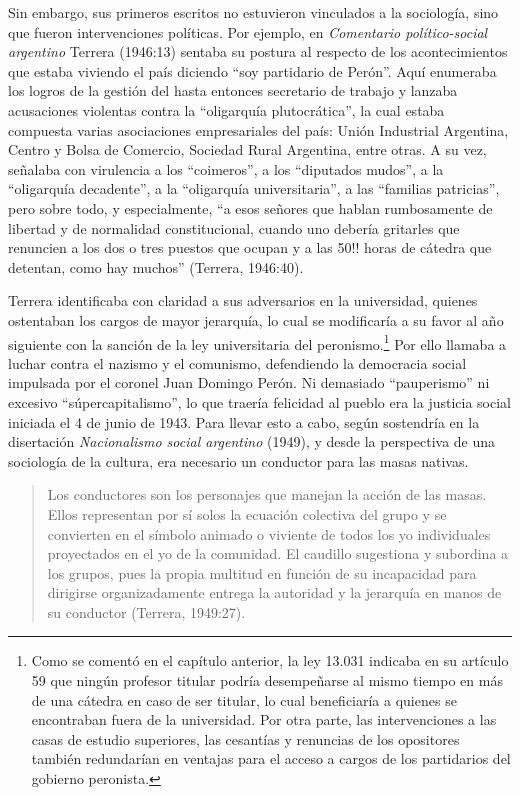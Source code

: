 Sin embargo, sus primeros escritos no estuvieron vinculados a la sociología, sino que fueron intervenciones políticas. Por ejemplo, en \emph{Comentario político-social argentino} Terrera (1946:13) sentaba su postura al respecto de los acontecimientos que estaba viviendo el país diciendo ``soy partidario de Perón''. Aquí enumeraba los logros de la gestión del hasta entonces secretario de trabajo y lanzaba acusaciones violentas contra la ``oligarquía plutocrática'', la cual estaba compuesta varias asociaciones empresariales del país: Unión Industrial Argentina, Centro y Bolsa de Comercio, Sociedad Rural Argentina, entre otras. A su vez, señalaba con virulencia a los ``coimeros'', a los ``diputados mudos'', a la ``oligarquía decadente'', a la ``oligarquía universitaria'', a las ``familias patricias'', pero sobre todo, y especialmente, ``a esos señores que hablan rumbosamente de libertad y de normalidad constitucional, cuando uno debería gritarles que renuncien a los dos o tres puestos que ocupan y a las 50!! horas de cátedra que detentan, como hay muchos'' (Terrera, 1946:40).

Terrera identificaba con claridad a sus adversarios en la universidad, quienes ostentaban los cargos de mayor jerarquía, lo cual se modificaría a su favor al año siguiente con la sanción de la ley universitaria del peronismo.\footnote{Como se comentó en el capítulo anterior, la ley 13.031 indicaba en su artículo 59 que ningún profesor titular podría desempeñarse al mismo tiempo en más de una cátedra en caso de ser titular, lo cual beneficiaría a quienes se encontraban fuera de la universidad. Por otra parte, las intervenciones a las casas de estudio superiores, las cesantías y renuncias de los opositores también redundarían en ventajas para el acceso a cargos de los partidarios del gobierno peronista.} Por ello llamaba a luchar contra el nazismo y el comunismo, defendiendo la democracia social impulsada por el coronel Juan Domingo Perón. Ni demasiado ``pauperismo'' ni excesivo ``súpercapitalismo'', lo que traería felicidad al pueblo era la justicia social iniciada el 4 de junio de 1943. Para llevar esto a cabo, según sostendría en la disertación \emph{Nacionalismo social argentino} (1949), y desde la perspectiva de una sociología de la cultura, era necesario un conductor para las masas nativas.

\begin{quote}
Los conductores son los personajes que manejan la acción de las masas. Ellos representan por sí solos la ecuación colectiva del grupo y se convierten en el símbolo animado o viviente de todos los yo individuales proyectados en el yo de la comunidad. El caudillo sugestiona y subordina a los grupos, pues la propia multitud en función de su incapacidad para dirigirse organizadamente entrega la autoridad y la jerarquía en manos de su conductor (Terrera, 1949:27).
\end{quote}

